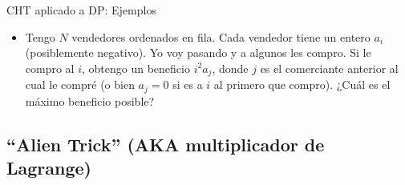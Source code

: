 \documentclass{beamer}
\begin{document}
\begin{frame}{CHT aplicado a DP: Ejemplos}
    \begin{itemize}
            \item Tengo $N$ vendedores ordenados en fila. Cada vendedor tiene un entero $a_i$ (posiblemente negativo). Yo voy pasando y a algunos les compro. Si le compro al $i$, obtengo un beneficio $i^2 a_j$, donde $j$ es el comerciante anterior al cual le compré (o bien $a_j=0$ si es a $i$ al primero que compro). ¿Cuál es el máximo beneficio posible?
            \pause
            \pause
    \end{itemize}
\end{frame}


\subsection{``Alien Trick'' (AKA multiplicador de Lagrange)}
\end{document}
